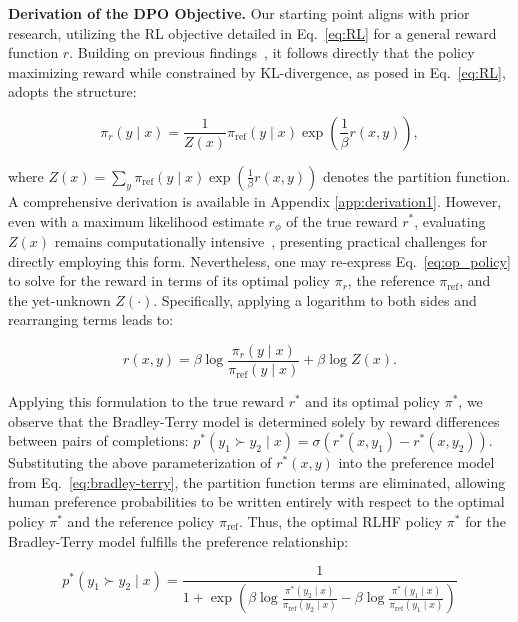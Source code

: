\textbf{Derivation of the DPO Objective.} Our starting point aligns with prior research, utilizing the RL objective detailed in Eq.~\ref{eq:RL} for a general reward function $r$. Building on previous findings~\citep{peters2007reinforcement, peng2019advantage, korbak2022reinforcement, go2023aligning}, it follows directly that the policy maximizing reward while constrained by KL-divergence, as posed in Eq.~\ref{eq:RL}, adopts the structure:

\begin{equation}\label{eq:op_policy}
    \pi_r(y\mid x) = \frac{1}{Z(x)}\pi_\text{ref}(y\mid x)\exp\left(\frac{1}{\beta}r(x, y)\right),
\end{equation}

where $Z(x) =\sum_{y}\pi_\text{ref}(y\mid x)\exp\left(\frac{1}{\beta}r(x, y)\right)$ denotes the partition function. A comprehensive derivation is available in Appendix \ref{app:derivation1}. However, even with a maximum likelihood estimate $r_{\phi}$ of the true reward $r^*$, evaluating $Z(x)$ remains computationally intensive~\citep{korbak2022reinforcement, go2023aligning}, presenting practical challenges for directly employing this form. Nevertheless, one may re-express Eq.~\ref{eq:op_policy} to solve for the reward in terms of its optimal policy $\pi_r$, the reference $\pi_\text{ref}$, and the yet-unknown $Z(\cdot)$. Specifically, applying a logarithm to both sides and rearranging terms leads to:

\begin{equation}\label{eq:main_eq}
    r(x,y) =\beta \log \frac{\pi_r(y\mid x)}{\pi_\text{ref}(y\mid x)} + \beta \log Z(x).
\end{equation}

Applying this formulation to the true reward $r^*$ and its optimal policy $\pi^*$, we observe that the Bradley-Terry model is determined solely by reward differences between pairs of completions: ${p^*(y_1 \succ y_2 \mid x) = \sigma(r^*(x, y_1) - r^*(x, y_2))}$. Substituting the above parameterization of $r^*(x,y)$ into the preference model from Eq.~\ref{eq:bradley-terry}, the partition function terms are eliminated, allowing human preference probabilities to be written entirely with respect to the optimal policy $\pi^*$ and the reference policy $\pi_\text{ref}$. Thus, the optimal RLHF policy $\pi^*$ for the Bradley-Terry model fulfills the preference relationship:

\begin{equation}\label{eq:objective}
    p^*(y_1\succ y_2 \mid x)=\frac{1}{1 + \exp\left(\beta \log \frac{\pi^*(y_2\mid x)}{\pi_\text{ref}(y_2\mid x)} - \beta \log \frac{\pi^*(y_1\mid x)}{\pi_\text{ref}(y_1\mid x)}\right)}
\end{equation}

